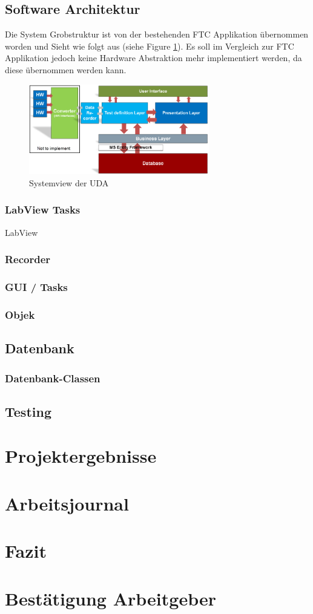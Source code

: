 \documentclass[10pt]{scrartcl}
\begin{document}
\subsection{Software Architektur}
Die System Grobstruktur ist von der bestehenden FTC Applikation übernommen worden und Sieht wie folgt aus (siehe Figure \ref{fig:SystemViewUDA}). Es soll im Vergleich zur FTC Applikation jedoch keine Hardware Abstraktion mehr implementiert werden, da diese übernommen werden kann.
\begin{figure}[htbp] 
	\centering
	\includegraphics[width=0.7\textwidth]{Systemview}
	\caption{Systemview der UDA}
	\label{fig:SystemViewUDA}
\end{figure}
\subsubsection{LabView Tasks}
LabView
\subsubsection{Recorder}
\subsubsection{GUI / Tasks}
\subsubsection{Objek}
\subsection{Datenbank}
\subsubsection{Datenbank-Classen}
\subsection{Testing}
\section{Projektergebnisse}
\section{Arbeitsjournal}
\section{Fazit}
\section{Bestätigung Arbeitgeber}
\end{document}
